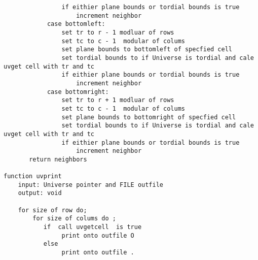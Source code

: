 \documentclass[11pt]{article} %
\begin{document}
\begin{flushleft}
\begin{lstlisting}
                if eithier plane bounds or tordial bounds is true 
                    increment neighbor
            case bottomleft:
                set tr to r - 1 modluar of rows 
                set tc to c - 1  modular of colums
                set plane bounds to bottomleft of specfied cell
                set tordial bounds to if Universe is tordial and cale uvget cell with tr and tc 
                if eithier plane bounds or tordial bounds is true 
                    increment neighbor
            case bottomright:
                set tr to r + 1 modluar of rows
                set tc to c - 1  modular of colums
                set plane bounds to bottomright of specfied cell
                set tordial bounds to if Universe is tordial and cale uvget cell with tr and tc 
                if eithier plane bounds or tordial bounds is true 
                    increment neighbor
       return neighbors 

function uvprint
    input: Universe pointer and FILE outfile
    output: void 

    for size of row do;
        for size of colums do ;
           if  call uvgetcell  is true
                print onto outfile O
           else 
                print onto outfile .

\end{lstlisting}

\end{flushleft}
\end{document}

